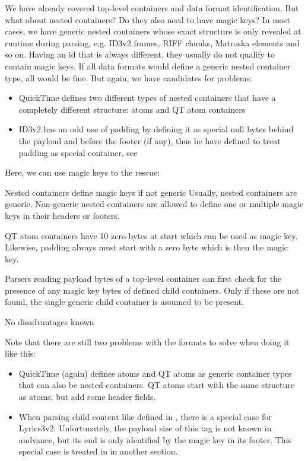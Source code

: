 We have already covered top-level containers and data format identification. But what about nested containers? Do they also need to have magic keys? In most cases, we have generic nested containers whose exact structure is only revealed at runtime during parsing, e.g. ID3v2 frames, RIFF chunks, Matroska elements and so on. Having an id that is always different, they usually do not qualify to contain magic keys. If all data formats would define a generic nested container type, all would be fine. But again, we have candidates for problems:
\begin{itemize}
\item QuickTime defines two different types of nested containers that have a completely different structure: atoms and QT atom containers
\item ID3v2 has an odd use of padding by defining it as special null bytes behind the payload and before the footer (if any), thus he have defined to treat padding as special container, see  
\end{itemize}

Here, we can use magic keys to the rescue:

{%
Nested containers define magic keys if not generic
}
{%
Usually, nested containers are generic. Non-generic nested containers are allowed to define one or multiple magic keys in their headers or footers. 
}
{%
QT atom containers have 10 zero-bytes at start which can be used as magic key. Likewise, padding always must start with a zero byte which is then the magic key.

Parsers reading payload bytes of a top-level container can first check for the presence of any magic key bytes of defined child containers. Only if these are not found, the single generic child container is assumed to be present. 
}
{%
No disadvantages known
}

Note that there are still two problems with the formats to solve when doing it like this:
\begin{itemize}
\item QuickTime (again) defines atoms and QT atoms as generic container types that can also be nested containers. QT atoms start with the same structure as atoms, but add some header fields.
\item When parsing child content like defined in , there is a special case for Lyrics3v2: Unfortunately, the payload size of this tag is not known in andvance, but its end is only identified by the magic key in its footer. This special case is treated in  in another section. 
\end{itemize}


